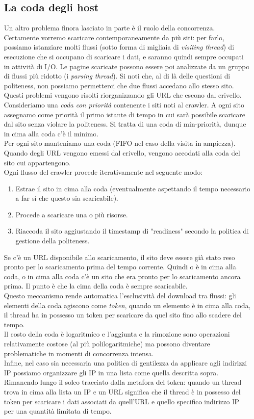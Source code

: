 \subsection{La coda degli host}
Un altro problema finora lasciato in parte è il ruolo della concorrenza. Certamente vorremo scaricare contemporaneamente da più siti: per farlo, possiamo istanziare molti flussi (sotto forma di migliaia di \textit{visiting thread}) di esecuzione che si occupano di scaricare i dati, e saranno quindi sempre occupati in attività di I/O. Le pagine scaricate possono essere poi analizzate da un gruppo di flussi più ridotto (i \textit{parsing thread}). Si noti che, al di là delle questioni di politeness, non possiamo permetterci che due flussi accedano allo stesso sito.\\
Questi problemi vengono risolti riorganizzando gli URL che escono dal crivello. Consideriamo una \textit{coda con priorità} contenente i siti noti al crawler. A ogni sito assegnamo come priorità il primo istante di tempo in cui sarà possibile scaricare dal sito senza violare la politeness. Si tratta di una coda di min-priorità, dunque in cima alla coda c'è il minimo.\\
Per ogni sito manteniamo una coda (FIFO nel caso della visita in ampiezza). Quando degli URL vengono emessi dal crivello, vengono accodati alla coda del sito cui appartengono.\\
Ogni flusso del crawler procede iterativamente nel seguente modo:
\begin{enumerate}
    \item Estrae il sito in cima alla coda (eventualmente aspettando il tempo necessario a far sì che questo sia scaricabile).
    \item Procede a scaricare una o più risorse.
    \item Riaccoda il sito aggiustando il timestamp di "readiness" secondo la politica di gestione della politeness.
\end{enumerate}
Se c'è un URL disponibile allo scaricamento, il sito deve essere già stato reso pronto per lo scaricamento prima del tempo corrente. Quindi o è in cima alla coda, o in cima alla coda c'è un sito che era pronto per lo scaricamento ancora prima. Il punto è che la cima della coda è sempre scaricabile.\\
Questo meccanismo rende automatica l'esclusività del download tra flussi: gli elementi della coda agiscono come \textit{token}, quando un elemento è in cima alla coda, il thread ha in possesso un token per scaricare da quel sito fino allo scadere del tempo.\\
Il costo della coda è logaritmico e l'aggiunta e la rimozione sono operazioni relativamente costose (al più polilogaritmiche) ma possono diventare problematiche in momenti di concorrenza intensa.\\
Infine, nel caso sia necessaria una politica di gentilezza da applicare agli indirizzi IP possiamo organizzare gli IP in una lista come quella descritta sopra. Rimanendo lungo il solco tracciato dalla metafora del token: quando un thread trova in cima alla lista un IP e un URL significa che il thread è in possesso del token per scaricare i dati associati da quell'URL e quello specifico indirizzo IP per una quantità limitata di tempo.
